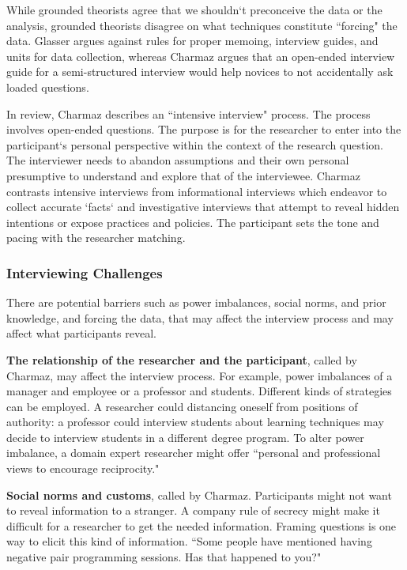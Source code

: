 While grounded theorists agree that we shouldn`t preconceive the data or the analysis, grounded theorists disagree on what techniques constitute ``forcing" the data. Glasser \cite{GlaserIssues} argues against rules for proper memoing, interview guides, and units for data collection, whereas Charmaz argues that an open-ended interview guide for a semi-structured interview would help novices to not accidentally ask loaded questions. 

In review, Charmaz describes an ``intensive interview" process. The process involves open-ended questions. The purpose is for the researcher to enter into the participant`s personal perspective within the context of the research question. The interviewer needs to abandon assumptions and their own personal presumptive to understand and explore that of the interviewee. Charmaz contrasts intensive interviews from informational interviews which endeavor to collect accurate `facts` and investigative interviews that attempt to reveal hidden intentions or  expose practices and policies. The participant sets the tone and pacing with the researcher matching. 
\subsubsection{Interviewing Challenges}
There are potential barriers such as power imbalances, social norms, and prior knowledge, and forcing the data, that may affect the interview process and may affect what participants reveal. 

\textbf{The relationship of the researcher and the participant}, called  by Charmaz, may affect the interview process. For example, power imbalances of a manager and employee or a professor and students.  Different kinds of strategies can be employed. A researcher could distancing oneself from positions of authority: a professor could interview students about learning techniques may decide to interview students in a different degree program. To alter power imbalance, a domain expert researcher might offer ``personal and professional views to encourage reciprocity." 

\textbf{Social norms and customs}, called  by Charmaz. Participants might not want to reveal information to a stranger. A company rule of secrecy might make it difficult for a researcher to get the needed information. Framing questions is one way to elicit this kind of information. ``Some people have mentioned having negative pair programming sessions. Has that happened to you?" 

